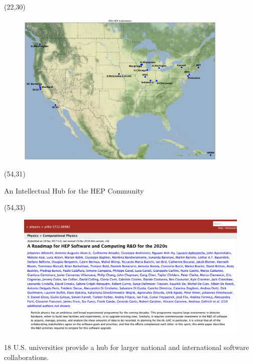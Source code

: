 \documentclass[final]{beamer}
\begin{document}
\begin{frame}{}
\begin{textblock}{32.0}(22,30)
\begin{figure}[tbph]
\centering
\includegraphics[width=0.90\textwidth]{images/iris-hep-map-V1.png}
\end{figure}
\end{textblock}

\begin{textblock}{28.0}(54,31)
\begin{block}{An Intellectual Hub for the HEP Community}
\begin{textblock}{26.0}(54,33)
\begin{figure}[tbph]
\centering
\includegraphics[width=1.07\textwidth]{images/20230925-arxiv-roadmap.png}
\end{figure}
18 U.S. universities provide a hub for larger national and international software collaborations.
\end{textblock}
\end{block}
\end{textblock}





\end{frame}
\end{document}
